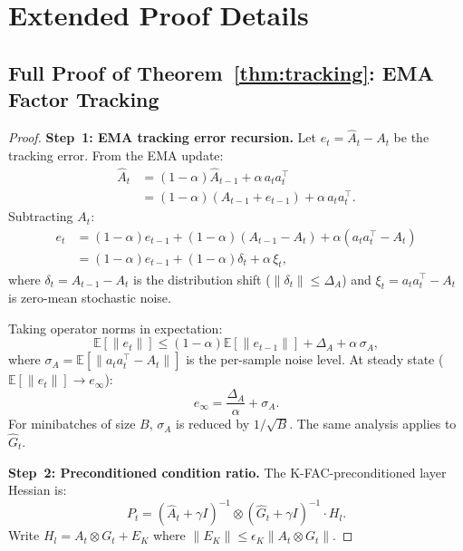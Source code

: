 \documentclass{article}
\providecommand{\E}{\mathbb{E}}
\providecommand{\norm}[1]{\lVert #1 \rVert}
\theoremstyle{plain}
\theoremstyle{definition}
\theoremstyle{remark}
\begin{document}



\appendix

\section{Extended Proof Details}
\label{app:proofs}

\subsection{Full Proof of Theorem~\ref{thm:tracking}: EMA Factor Tracking}

\begin{proof}
\textbf{Step~1: EMA tracking error recursion.}
Let $e_t = \hat{A}_t - A_t$ be the tracking error. From the EMA update:
\begin{align}
    \hat{A}_t &= (1-\alpha)\hat{A}_{t-1} + \alpha\,a_t a_t^\top \nonumber \\
    &= (1-\alpha)(A_{t-1} + e_{t-1}) + \alpha\,a_t a_t^\top.
\end{align}
Subtracting $A_t$:
\begin{align}
    e_t &= (1-\alpha)e_{t-1} + (1-\alpha)(A_{t-1} - A_t) + \alpha(a_t a_t^\top - A_t) \nonumber \\
    &= (1-\alpha)e_{t-1} + (1-\alpha)\delta_t + \alpha\,\xi_t,
\end{align}
where $\delta_t = A_{t-1} - A_t$ is the distribution shift ($\norm{\delta_t} \leq \Delta_A$) and $\xi_t = a_t a_t^\top - A_t$ is zero-mean stochastic noise.

Taking operator norms in expectation:
\begin{equation}
    \E[\norm{e_t}] \leq (1-\alpha)\E[\norm{e_{t-1}}] + \Delta_A + \alpha\,\sigma_A,
\end{equation}
where $\sigma_A = \E[\norm{a_t a_t^\top - A_t}]$ is the per-sample noise level. At steady state ($\E[\norm{e_t}] \to e_\infty$):
\begin{equation}
    e_\infty = \frac{\Delta_A}{\alpha} + \sigma_A.
\end{equation}
For minibatches of size $B$, $\sigma_A$ is reduced by $1/\sqrt{B}$. The same analysis applies to $\hat{G}_t$.

\textbf{Step~2: Preconditioned condition ratio.}
The K-FAC-preconditioned layer Hessian is:
\begin{equation}
    P_t = (\hat{A}_t + \gamma I)^{-1} \otimes (\hat{G}_t + \gamma I)^{-1} \cdot H_l.
\end{equation}
Write $H_l = A_t \otimes G_t + E_K$ where $\norm{E_K} \leq \epsilon_K\norm{A_t \otimes G_t}$.


\end{proof}
\end{document}

